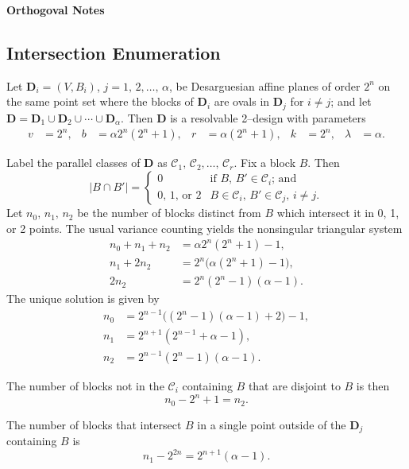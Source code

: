 \documentclass[a4paper,11pt]{article}
\theoremstyle{mythm}
\newcommand{\abs}[1]{\left\vert #1 \right\vert}
\begin{document}
\begin{center}
  {\Large\bfseries Orthogoval Notes}
\end{center}

\subsection*{Intersection Enumeration}

Let $\mathbf{D}_i=(V,B_i)$, $j=1,\,2,\dots,\,\alpha$, be Desarguesian affine
planes of order $2^n$ on the same point set where the blocks of $\mathbf{D}_i$
are ovals in $\mathbf{D}_j$ for $i \neq j$; and let $\mathbf{D} = \mathbf{D}_1
\cup \mathbf{D}_2 \cup \cdots \cup \mathbf{D}_\alpha$. Then $\mathbf{D}$ is a
resolvable 2--design with parameters
\begin{align*}
  v &= 2^n, & b &= \alpha 2^n(2^n+1), & r &= \alpha(2^n+1), & k &= 2^n, & \lambda &= \alpha.
\end{align*}

Label the parallel classes of $\mathbf{D}$ as
$\mathscr{C}_1,\,\mathscr{C}_2,\dots,\,\mathscr{C}_r$. Fix a block $B$. Then
\[
  \abs{B \cap B'} =
  \begin{cases}
    0 & \text{if $B,\,B' \in \mathscr{C}_i$; and} \\
    \text{0, 1, or 2} & \text{$B \in \mathscr{C}_i$, $B' \in \mathscr{C}_j$, $i
                        \neq j$.}
  \end{cases}
\]
Let $n_0,\,n_1,\,n_2$ be the number of blocks distinct from $B$ which intersect
it in 0, 1, or 2 points. The usual variance counting yields the nonsingular
triangular system
\begin{align*}
  n_0+n_1+n_2 &= \alpha 2^n(2^n+1) - 1, \\
  n_1+2n_2 &= 2^n\Big( \alpha(2^n+1) - 1 \Big), \\
  2n_2 &= 2^n(2^n-1)(\alpha-1).
\end{align*}
The unique solution is given by
\begin{align*}
  n_0 &= 2^{n-1}\Big( (2^n-1)(\alpha-1)+2 \Big)-1, \\
  n_1 &= 2^{n+1}(2^{n-1}+\alpha-1), \\
  n_2 &= 2^{n-1}(2^n-1)(\alpha-1).
\end{align*}

\noindent The number of blocks not in the $\mathscr{C}_i$ containing $B$ that
are disjoint to $B$ is then
\[
  n_0-2^n+1 = n_2.
\]

\noindent The number of blocks that intersect $B$ in a single point outside of
the $\mathbf{D}_j$ containing $B$ is
\[
  n_1 - 2^{2n} = 2^{n+1}(\alpha-1).
\]
\end{document}
